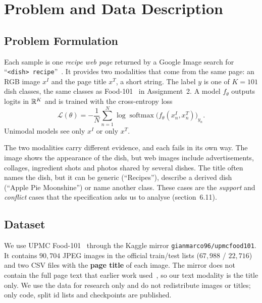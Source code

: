 \setcounter{section}{0}
\section{Problem and Data Description}
\label{sec:part1}

\subsection{Problem Formulation}
\label{sec:problem}

Each sample is one \emph{recipe web page} returned by a Google Image search for
``\texttt{<dish> recipe}''~\cite{wang2015recipe}. It provides two modalities that come from the same page:
an RGB image $x^{I}$ and the page title $x^{T}$, a short string. The label $y$ is one of $K=101$ dish classes,
the same classes as Food-101~\cite{bossard2014food} in Assignment~2. A model $f_\theta$ outputs logits in
$\mathbb{R}^{K}$ and is trained with the cross-entropy loss
\begin{equation}
  \mathcal{L}(\theta) = -\frac{1}{N}\sum_{n=1}^{N} \log \operatorname{softmax}\big(f_\theta(x^{I}_n, x^{T}_n)\big)_{y_n}.
\end{equation}
Unimodal models see only $x^{I}$ or only $x^{T}$.

The two modalities carry different evidence, and each fails in its own way. The image shows the
appearance of the dish, but web images include advertisements, collages, ingredient shots and photos shared
by several dishes. The title often names the dish, but it can be generic (``Recipes''), describe a derived
dish (``Apple Pie Moonshine'') or name another class. These cases are the \emph{support} and \emph{conflict}
cases that the specification asks us to analyse (section~6.11).

\subsection{Dataset}
\label{sec:dataset}

We use UPMC Food-101~\cite{wang2015recipe} through the Kaggle mirror \texttt{gianmarco96/upmcfood101}.
It contains $90{,}704$ JPEG images in the official train/test lists ($67{,}988$ / $22{,}716$) and two CSV
files with the \textbf{page title} of each image. The mirror does not contain the full page text that earlier
work used~\cite{kiela2019mmbt}, so our text modality is the title only. We use the data for research only and
do not redistribute images or titles; only code, split id lists and checkpoints are published.

